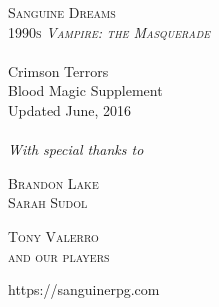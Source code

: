 \begin{titlepage}
\thispagestyle{empty}

\begin{center}

\vspace*{5cm}

\textsc{\Huge Sanguine Dreams}\\[0.5cm]

\textsc{\LARGE 1990s \emph{Vampire: the Masquerade}}\\[0.5cm]

\TitleRule \\[0.6cm]
{ \LARGE Crimson Terrors}\\[0.2cm]
{ Blood Magic Supplement } \\[0.4cm]
{ Updated June, 2016 }\\[0.4cm]		%
\TitleRule \\[1.5cm]

\textit{With special thanks to}\\
\vspace*{0.5cm}

\begin{minipage}{0.4\textwidth}
\begin{flushleft} \large
\textsc{Brandon Lake}\\
\textsc{Sarah Sudol}\\
\end{flushleft}
\end{minipage}
\begin{minipage}{0.4\textwidth}
\begin{flushright} \large
\textsc{Tony Valerro}\\
\textsc{and our players}\\
\end{flushright}
\end{minipage}


\vspace{3.5cm}			%
{\large https://sanguinerpg.com}

\end{center}
\end{titlepage}


